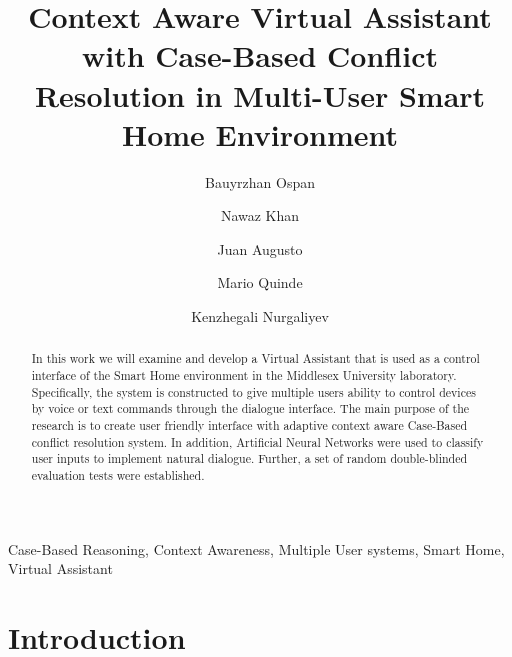 \documentclass{llncs}
\begin{document}
    \title{Context Aware Virtual Assistant with
    Case-Based Conflict Resolution in
    Multi-User Smart Home Environment}
    \author{Bauyrzhan Ospan \and Nawaz Khan  \and Juan Augusto  \and Mario Quinde   \and Kenzhegali Nurgaliyev }
    \maketitle
    \begin{abstract}
        In this work we will examine and develop a Virtual Assistant that is used as a control
        interface of the Smart Home environment in the Middlesex University laboratory.
        Specifically, the system is
        constructed to give multiple users ability to control devices by voice or text commands through the dialogue
        interface.
        The main purpose of the research is to create user friendly interface with adaptive context aware
        Case-Based conflict resolution system.
        In addition, Artificial Neural Networks were used to classify user inputs to implement natural dialogue.
        Further, a set of random double-blinded
        evaluation tests were established.
    \end{abstract}
    \begin{keywords}
        Case-Based Reasoning, Context Awareness, Multiple User systems, Smart Home, Virtual Assistant
    \end{keywords}
    \section{Introduction}
    
\end{document}
